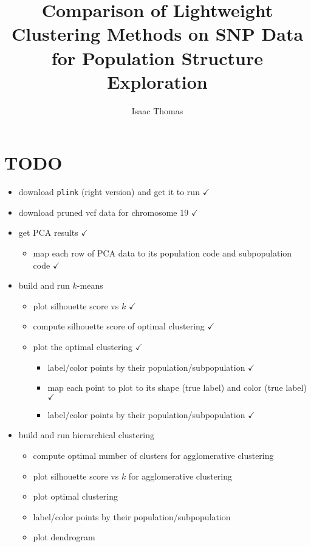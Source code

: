\documentclass[letterpaper]{article}
\title{Comparison of Lightweight Clustering Methods on SNP Data for Population Structure Exploration}
\author{Isaac Thomas}
\newcommand{\code}[1]{\texttt{#1}}
\theoremstyle{definition}
\begin{document}
\maketitle

\section{TODO}
\begin{itemize}
    \item download \code{plink} (right version) and get it to run $\checkmark$
    \item download pruned vcf data for chromosome 19 $\checkmark$
    \item get PCA results $\checkmark$
        \begin{itemize}
            \item map each row of PCA data to its population code and subpopulation code $\checkmark$
        \end{itemize}
    \item build and run $k$-means
    \begin{itemize}
        \item plot silhouette score vs $k$ $\checkmark$
        \item compute silhouette score of optimal clustering $\checkmark$
        \item plot the optimal clustering $\checkmark$
        \begin{itemize}
            \item label/color points by their population/subpopulation $\checkmark$
            \item map each point to plot to its shape (true label) and color (true label) $\checkmark$
            \item label/color points by their population/subpopulation $\checkmark$
        \end{itemize}
    \end{itemize}
    \item build and run hierarchical clustering
    \begin{itemize}
        \item compute optimal number of clusters for agglomerative clustering
        \item plot silhouette score vs $k$ for agglomerative clustering
        \item plot optimal clustering
        \item label/color points by their population/subpopulation
        \item plot dendrogram
    \end{itemize}

\end{itemize}
\end{document}

